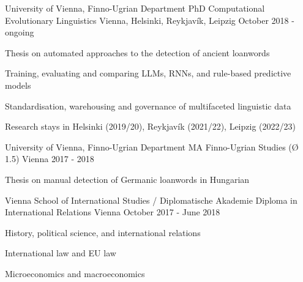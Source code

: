 

\begin{cventries}

  \cventry
    {University of Vienna, Finno-Ugrian Department} %
    {PhD Computational Evolutionary Linguistics} %
    {Vienna, Helsinki, Reykjavík, Leipzig} %
    {October 2018 - ongoing} %
    {
      \begin{cvitems} %
        \item{Thesis on automated approaches to the detection of ancient loanwords}
        \item{Training, evaluating and comparing LLMs, RNNs, and rule-based predictive models}
        \item{Standardisation, warehousing and governance of multifaceted linguistic data}
        \item{Research stays in Helsinki (2019/20), Reykjavík (2021/22), Leipzig (2022/23)}
      \end{cvitems}
    }

  \cventry
    {University of Vienna, Finno-Ugrian Department} %
    {MA Finno-Ugrian Studies (Ø 1.5)} %
    {Vienna} %
    {2017 - 2018} %
    {
      \begin{cvitems} %
        \item {Thesis on manual detection of Germanic loanwords in Hungarian}
      \end{cvitems}
    }

  \cventry
    {Vienna School of International Studies / Diplomatische Akademie} %
    {Diploma in International Relations} %
    {Vienna} %
    {October 2017 - June 2018} %
    {
    \begin{cvitems} %
        \item{History, political science, and international relations}
        \item{International law and EU law}
        \item{Microeconomics and macroeconomics}
      \end{cvitems}
    }
    

\end{cventries}

